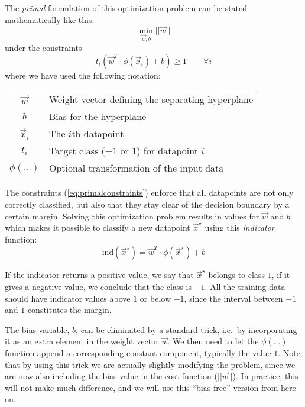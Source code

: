 \documentclass{article}
\begin{document}
The \emph{primal} formulation of this optimization problem can be
stated mathematically like this:
\begin{equation}\label{eq:primal}
  \min_{\vec{w}, b} ||\vec{w}||
\end{equation}
under the constraints
\begin{equation}\label{eq:primalconstraints}
t_i(\vec{w}^T\cdot\phi(\vec{x}_i) + b) \ge 1 \qquad \forall i
\end{equation}
where we have used the following notation:
\begin{center}
  \begin{tabular}{cl}
    \(\vec{w}\) & Weight vector defining the separating hyperplane \\
    \(b\) & Bias for the hyperplane \\
    \(\vec{x}_i\) & The \(i\)th datapoint \\
    \(t_i\) & Target class (\(-1\) or \(1\)) for datapoint \(i\) \\
    \(\phi(\ldots)\) & Optional transformation of the input data \\
  \end{tabular}
\end{center}

The constraints (\ref{eq:primalconstraints}) enforce that all
datapoints are not only correctly classified, but also that they stay
clear of the decision boundary by a certain margin.  Solving this
optimization problem results in values for \(\vec{w}\) and \(b\) which
makes it possible to classify a new datapoint \(\vec{x}^\star\) using
this \emph{indicator} function:
\begin{equation}\label{eq:primalindicator}
  \mathrm{ind}(\vec{x}^\star) = \vec{w}^T\cdot\phi(\vec{x}^\star) + b
\end{equation}

If the indicator returns a positive value, we say that
\(\vec{x}^\star\) belongs to class \(1\), if it gives a negative
value, we conclude that the class is \(-1\).  All the training data
should have indicator values above \(1\) or below \(-1\), since the
interval between \(-1\) and \(1\) constitutes the margin.

The bias variable, \(b\), can be eliminated by a standard trick, i.e.\
by incorporating it as an extra element in the weight vector
\(\vec{w}\).  We then need to let the \(\phi(\ldots)\) function append
a corresponding constant component, typically the value \(1\).  Note
that by using this trick we are actually slightly modifying the
problem, since we are now also including the bias value in the cost
function (\(||\vec{w}||\)).  In practice, this will not make much
difference, and we will use this ``bias free'' version from here on.
\end{document}
